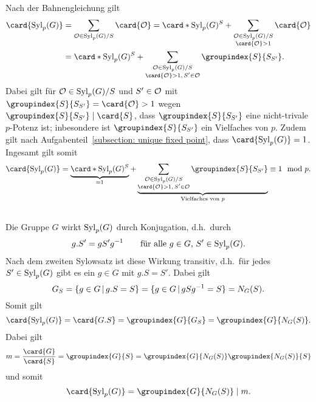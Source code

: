 Nach der Bahnengleichung gilt
\begin{align*}
      \card{\Sylow{p}{G}}
  &=  \sum_{\orbit \in \Sylow{p}{G}/S} \card{\orbit}
   =    \card*{\Sylow{p}{G}^S}
      + \sum_{\substack{\orbit \in \Sylow{p}{G}/S \\ \card{\orbit} > 1}}
        \card{\orbit}
  \\
  &=    \card*{\Sylow{p}{G}^S}
      + \sum_{\substack{\orbit \in \Sylow{p}{G}/S \\ \card{\orbit} > 1, \, S' \in \orbit}}
        \groupindex{S}{S_{S'}}.
\end{align*}
Dabei gilt für $\mathcal{O} \in \operatorname{Syl}_{p}(G)/S$ und $S' \in \mathcal{O}$ mit $\groupindex{S}{S_{S'}} = \card{\orbit} > 1$ wegen $\groupindex{S}{S_{S'}} \divides \card{S}$, dass $\groupindex{S}{S_{S'}}$ eine nicht-trivale $p$-Potenz ist;
inbesondere ist $\groupindex{S}{S_{S'}}$ ein Vielfaches von $p$.
Zudem gilt nach Aufgabenteil~\ref{subsection: unique fixed point}, dass $\card{\Sylow{p}{G}} = 1$.
Ingesamt gilt somit
\[
          \card{\Sylow{p}{G}}
  =       \underbrace{ \card*{\Sylow{p}{G}^S} }_{=1}
          + \underbrace{
            \sum_{\substack{\orbit \in \Sylow{p}{G}/S \\ \card{\orbit} > 1, \, S' \in \orbit}}
            \groupindex{S}{S_{S'}}
            }_{\text{Vielfaches von $p$}}
  \equiv  1
  \mod    p.
\]





\subsection{}

Die Gruppe $G$ wirkt $\operatorname{Syl}_{p}(G)$ durch Konjugation, d.h.\ durch
\[
    g.S'
  = g S' g^{-1}
  \qquad
  \text{für alle $g \in G$, $S' \in \operatorname{Syl}_{p}(G)$}.
\]
Nach dem zweiten Sylowsatz ist diese Wirkung transitiv, d.h.\ für jedes $S' \in \operatorname{Syl}_{p}(G)$ gibt es ein $g \in G$ mit $g.S = S'$.
Dabei gilt
\[
    G_S
  = \{ g \in G \suchthat g.S = S \}
  = \{ g \in G \suchthat g S g^{-1} = S \}
  = \normalizer{S}{G}.
\]
Somit gilt
\[
    \card{\Sylow{p}{G}}
  = \card{G.S}
  = \groupindex{G}{G_S}
  = \groupindex{G}{\normalizer{S}{G}}.
\]
Dabei gilt
\[
    m
  = \frac{\card{G}}{\card{S}}
  = \groupindex{G}{S}
  = \groupindex{G}{\normalizer{S}{G}} \groupindex{\normalizer{S}{G}}{S}
\]
und somit
\[
            \card{\Sylow{p}{G}}
  =         \groupindex{G}{\normalizer{S}{G}}
  \divides  m.
\]
